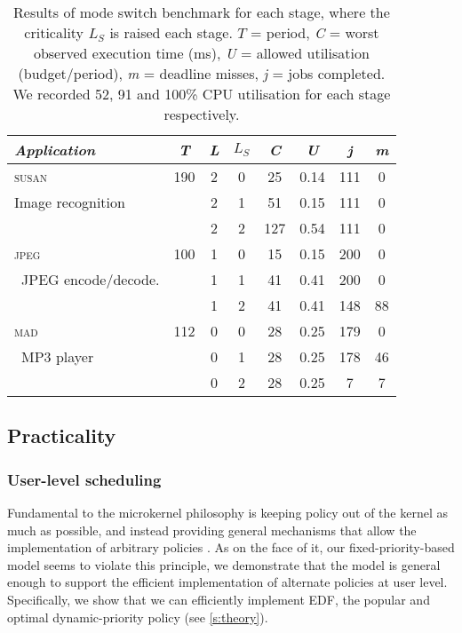 \begin{table}[h]
    \centering
    \begin{tabular}{lccccccc}\toprule
        \emph{Application} & \emph{T} & \emph{L} & \emph{\(L_S\)} & \emph{C} & \emph{U} & \emph{j} & \emph{m} \\\midrule
        \textsc{susan}            & 190 &2 & 0 & 25 & 0.14 & 111 & 0 \\
        \rowcolor{gray!25}
        \small{Image recognition} &     &2 & 1 & 51 & 0.15 & 111 & 0 \\
                                  &     &2 & 2 & 127 & 0.54 & 111 & 0 \\\midrule
        \textsc{jpeg}             & 100 &1 & 0 & 15 & 0.15 & 200 & 0 \\
        \rowcolor{gray!25}\
        \small{JPEG encode/decode.}       &     &1 & 1 & 41 & 0.41 & 200 & 0 \\
                                  &     &1 & 2 & 41 & 0.41 & 148 & 88 \\\midrule
        \textsc{mad}              & 112 &0 & 0 & 28 & 0.25 & 179 & 0 \\
        \rowcolor{gray!25}\
        \small{MP3 player}        &     &0 & 1 & 28 & 0.25 & 178 & 46\\
                                  &     &0 & 2 & 28 & 0.25 & 7 & 7 \\
        \bottomrule
    \end{tabular}
    \caption{Results of mode switch benchmark for each
        stage, where the  criticality \(L_S\) is raised each stage. \(T\) =
        period, \textit{C} = worst observed execution time (ms),
      \textit{U} = allowed utilisation (budget/period),
    \textit{m} = deadline misses, \textit{j} = jobs completed. We recorded 52, 91 and 100\% CPU
utilisation for each stage respectively.}
    \label{t:modeswitch}
\end{table}


\subsection{Practicality}

\subsubsection{User-level scheduling}\label{s:edf-impl}

Fundamental to the microkernel philosophy is keeping policy out of the
kernel as much as possible, and instead providing general mechanisms
that allow the implementation of arbitrary policies
\citep{Heiser_Elphinstone_16}.  As on the face of it, our
fixed-priority-based model seems to violate this principle,  we
demonstrate that the model is general enough to support the efficient
implementation of alternate policies at user level. Specifically, we
show that we can efficiently implement \gls{EDF}, the popular and  optimal dynamic-priority policy (see \autoref{s:theory}).

